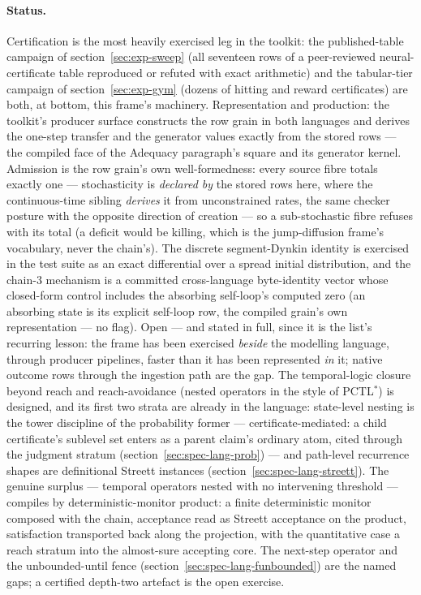 \paragraph{Status.} Certification is the most heavily exercised leg
in the toolkit: the published-table campaign of
section~\ref{sec:exp-sweep} (all seventeen rows of a peer-reviewed
neural-certificate table \cite{abate23} reproduced or refuted with
exact arithmetic) and the tabular-tier campaign of
section~\ref{sec:exp-gym} (dozens of hitting and reward
certificates) are both, at bottom, this frame's machinery.
Representation and production: the toolkit's producer surface
constructs the row grain in both languages and derives the one-step
transfer and the generator values exactly from the stored rows ---
the compiled face of the Adequacy paragraph's square and its
generator kernel. Admission is the row grain's own well-formedness:
every source fibre totals exactly one --- stochasticity is
\emph{declared by} the stored rows here, where the continuous-time
sibling \emph{derives} it from unconstrained rates, the same checker
posture with the opposite direction of creation --- so a
sub-stochastic fibre refuses with its total (a deficit would be
killing, which is the jump-diffusion frame's vocabulary, never the
chain's). The discrete segment-Dynkin identity is exercised in the
test suite as an exact differential over a spread initial
distribution, and the
chain-3 mechanism is a committed cross-language byte-identity vector
whose closed-form control includes the absorbing self-loop's
computed zero (an absorbing state is its explicit self-loop row, the
compiled grain's own representation --- no flag). Open ---
and stated in full, since it is the list's recurring lesson:
the frame has been exercised \emph{beside} the modelling language,
through producer pipelines, faster than it has been represented
\emph{in} it; native outcome rows through the ingestion path are the
gap. The temporal-logic closure beyond reach and reach-avoidance
(nested operators in the style of PCTL$^*$) is designed, and its
first two strata are already in the language: state-level nesting is
the tower discipline of the probability former --- certificate-mediated:
a child certificate's sublevel set enters as a parent
claim's ordinary atom, cited through the judgment stratum
(section~\ref{sec:spec-lang-prob}) --- and
path-level recurrence shapes are definitional Streett instances
(section~\ref{sec:spec-lang-streett}). The genuine surplus ---
temporal operators nested with no intervening threshold --- compiles
by deterministic-monitor product: a finite deterministic monitor
composed with the chain, acceptance read as Streett acceptance on the
product, satisfaction transported back along the projection, with the
quantitative case a reach stratum into the almost-sure accepting
core. The next-step operator and the unbounded-until fence
(section~\ref{sec:spec-lang-funbounded}) are the named gaps; a
certified depth-two artefact is the open exercise.

